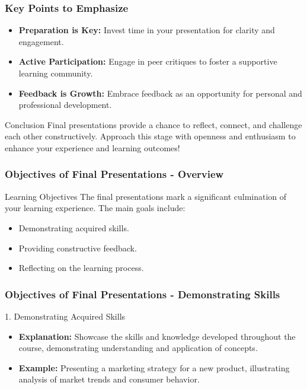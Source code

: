 \documentclass[aspectratio=169]{beamer}
\begin{document}
\begin{frame}[fragile]
    \frametitle{Key Points to Emphasize}
    \begin{itemize}
        \item \textbf{Preparation is Key:} Invest time in your presentation for clarity and engagement.
        \item \textbf{Active Participation:} Engage in peer critiques to foster a supportive learning community.
        \item \textbf{Feedback is Growth:} Embrace feedback as an opportunity for personal and professional development.
    \end{itemize}
    
    \begin{block}{Conclusion}
        Final presentations provide a chance to reflect, connect, and challenge each other constructively. Approach this stage with openness and enthusiasm to enhance your experience and learning outcomes!
    \end{block}
\end{frame}

\begin{frame}[fragile]
    \frametitle{Objectives of Final Presentations - Overview}
    \begin{block}{Learning Objectives}
        The final presentations mark a significant culmination of your learning experience. The main goals include:
        \begin{itemize}
            \item Demonstrating acquired skills.
            \item Providing constructive feedback.
            \item Reflecting on the learning process.
        \end{itemize}
    \end{block}
\end{frame}

\begin{frame}[fragile]
    \frametitle{Objectives of Final Presentations - Demonstrating Skills}
    \begin{block}{1. Demonstrating Acquired Skills}
        \begin{itemize}
            \item \textbf{Explanation:} Showcase the skills and knowledge developed throughout the course, demonstrating understanding and application of concepts.
            \item \textbf{Example:} Presenting a marketing strategy for a new product, illustrating analysis of market trends and consumer behavior.
        \end{itemize}
    \end{block}
\end{frame}
\end{document}
